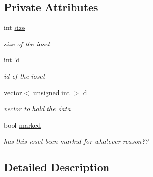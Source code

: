 \subsection*{Private Attributes}
\begin{DoxyCompactItemize}
\item 
\hypertarget{class_i_o_set_ae8acaf98753ad5fc405e7734988e371e}{
int \hyperlink{class_i_o_set_ae8acaf98753ad5fc405e7734988e371e}{size}}
\label{class_i_o_set_ae8acaf98753ad5fc405e7734988e371e}

\begin{DoxyCompactList}\small\item\em size of the ioset \item\end{DoxyCompactList}\item 
\hypertarget{class_i_o_set_aec085771a7d9c730275ab9cf08e3feed}{
int \hyperlink{class_i_o_set_aec085771a7d9c730275ab9cf08e3feed}{id}}
\label{class_i_o_set_aec085771a7d9c730275ab9cf08e3feed}

\begin{DoxyCompactList}\small\item\em id of the ioset \item\end{DoxyCompactList}\item 
\hypertarget{class_i_o_set_a606a04e94980958d24457389170fd92a}{
vector$<$ unsigned int $>$ \hyperlink{class_i_o_set_a606a04e94980958d24457389170fd92a}{d}}
\label{class_i_o_set_a606a04e94980958d24457389170fd92a}

\begin{DoxyCompactList}\small\item\em vector to hold the data \item\end{DoxyCompactList}\item 
\hypertarget{class_i_o_set_a3fad9f242ab3609cb303f12482fcc772}{
bool \hyperlink{class_i_o_set_a3fad9f242ab3609cb303f12482fcc772}{marked}}
\label{class_i_o_set_a3fad9f242ab3609cb303f12482fcc772}

\begin{DoxyCompactList}\small\item\em has this ioset been marked for whatever reason?? \item\end{DoxyCompactList}\end{DoxyCompactItemize}


\subsection{Detailed Description}



